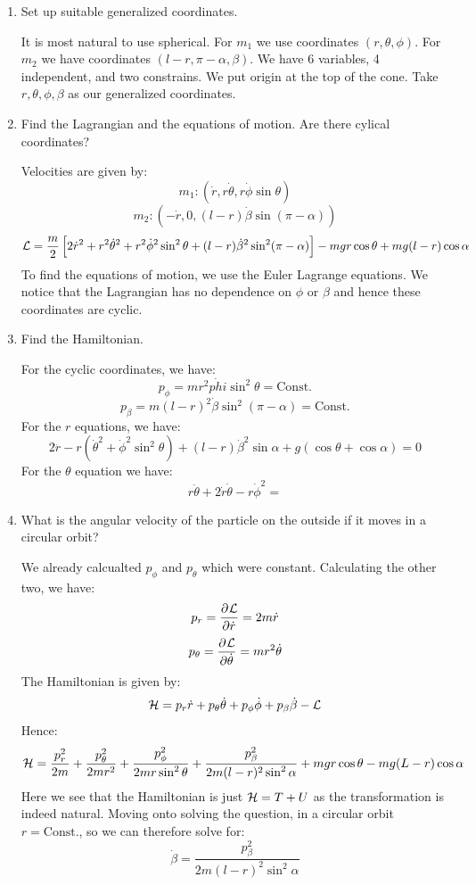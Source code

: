\begin{enumerate}
    \item Set up suitable generalized coordinates.
    \begin{s}
    It is most natural to use spherical. For $m_1$ we use coordinates $(r, \theta, \phi)$. For $m_2$ we have coordinates $(l - r, \pi - \alpha, \beta)$. We have 6 variables, 4 independent, and two constrains. We put origin at the top of the cone. Take $r, \theta, \phi, \beta$ as our generalized coordinates.
    \end{s}
    \item Find the Lagrangian and the equations of motion. Are there cylical coordinates?
    \begin{s}
    Velocities are given by:
    \[m_1: (\dot{r}, r\dot{\theta}, r\dot{\phi}\sin\theta)\]
    \[m_2: (-\dot{r}, 0, (l-r)\dot{\beta}\sin(\pi - \alpha))\]
    \[\mathcal{L} = \frac{m}{2}\left[2\dot{r}^2 + r^2\dot{\theta}^2 + r^2\dot{\phi}^2\sin^2\theta + (l-r)\dot{\beta}^2\sin^2(\pi - \alpha)\right] - mgr\cos\theta + mg(l-r)\cos\alpha\]
    To find the equations of motion, we use the Euler Lagrange equations. We notice that the Lagrangian has no dependence on $\phi$ or $\beta$ and hence these coordinates are cyclic.
    \end{s}
    \item Find the Hamiltonian.
    \begin{s}
    For the cyclic coordinates, we have:
    \[p_\phi = mr^2\dot{phi}\sin^2\theta = \text{Const.}\]
    \[p_\beta = m(l-r)^2\dot{\beta}\sin^2(\pi - \alpha) = \text{Const.}\]
    For the $r$ equations, we have:
    \[2\ddot{r} - r(\dot{\theta}^2 + \dot{\phi}^2\sin^2\theta) + (l-r)\dot{\beta}^2\sin\alpha + g(\cos\theta + \cos\alpha) = 0\]
    For the $\theta$ equation we have:
    \[r\ddot{\theta} + 2\dot{r}\dot{\theta} - r\dot{\phi}^2 = \]
    \end{s}
    \item What is the angular velocity of the particle on the outside if it moves in a circular orbit?
    \begin{s}
    We already calcualted $p_\phi$ and $p_\theta$ which were constant. Calculating the other two, we have:
    \[p_r = \dpd{\LL}{\dot{r}} = 2m\dot{r}\]
    \[p_\theta = \dpd{\LL}{\dot{\theta}} = mr^2\dot{\theta}\]
    The Hamiltonian is given by:
    \[\mathcal{H} = p_r\dot{r} + p_\theta\dot{\theta} + p_\phi\dot{\phi} + p_\beta\dot{\beta} - \mathcal{L}\]
    Hence:
    \[\mathcal{H} = \frac{p_r^2}{2m} + \frac{p_\theta^2}{2mr^2} + \frac{p_\phi^2}{2mr\sin^2\theta} + \frac{p_\beta^2}{2m(l-r)^2\sin^2\alpha} + mgr\cos\theta - mg(L-r)\cos\alpha\]
    Here we see that the Hamiltonian is just $\mathcal{H} = T + U$ as the transformation is indeed natural. Moving onto solving the question, in a circular orbit $r = \text{Const.}$, so we can therefore solve for:
    \[\dot{\beta} = \frac{p_\beta^2}{2m(l-r)^2\sin^2\alpha}\]
    \end{s}
\end{enumerate}